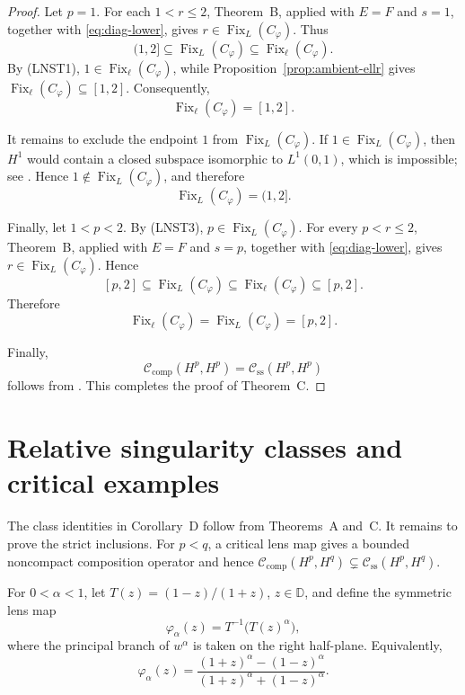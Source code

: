 \documentclass[10pt,a4paper]{amsart}
\newcommand{\D}{\mathbb{D}}
\newcommand{\CK}{\mathcal C_{\mathrm{comp}}}
\newcommand{\CS}{\mathcal C_{\mathrm{ss}}}
\begin{document}
\begin{proof}
Let \(p=1\). For each \(1<r\le2\), Theorem~B, applied with
\(E=F\) and \(s=1\), together with
\eqref{eq:diag-lower}, gives
\(r\in\operatorname{Fix}_{L}(C_\varphi)\). Thus
\[
        (1,2]
        \subseteq
        \operatorname{Fix}_{L}(C_\varphi)
        \subseteq
        \operatorname{Fix}_{\ell}(C_\varphi).
\]
By \textup{(LNST1)},
\(1\in\operatorname{Fix}_{\ell}(C_\varphi)\), while
Proposition~\ref{prop:ambient-ellr} gives
\(\operatorname{Fix}_{\ell}(C_\varphi)\subseteq[1,2]\).
Consequently,
\[
        \operatorname{Fix}_{\ell}(C_\varphi)=[1,2].
\]

It remains to exclude the endpoint \(1\) from
\(\operatorname{Fix}_{L}(C_\varphi)\).
If \(1\in\operatorname{Fix}_{L}(C_\varphi)\), then \(H^1\) would
contain a closed subspace isomorphic to \(L^1(0,1)\), which is
impossible; see \cite[p.~262]{KwapienPelczynski1976}. Hence
\(1\notin\operatorname{Fix}_{L}(C_\varphi)\), and therefore
\[
        \operatorname{Fix}_{L}(C_\varphi)=(1,2].
\]

Finally, let \(1<p<2\). By \textup{(LNST3)},
\(p\in\operatorname{Fix}_{L}(C_\varphi)\). For every \(p<r\le2\),
Theorem~B, applied with \(E=F\) and \(s=p\), together with
\eqref{eq:diag-lower}, gives
\(r\in\operatorname{Fix}_{L}(C_\varphi)\). Hence
\[
        [p,2]
        \subseteq
        \operatorname{Fix}_{L}(C_\varphi)
        \subseteq
        \operatorname{Fix}_{\ell}(C_\varphi)
        \subseteq
        [p,2].
\]
Therefore
\[
        \operatorname{Fix}_{\ell}(C_\varphi)
        =
        \operatorname{Fix}_{L}(C_\varphi)
        =
        [p,2].
\]

Finally,
\[
        \CK(H^p,H^p)
        =
        \CS(H^p,H^p)
\]
follows from \cite[Corollary~1.3]{LNST2017}.
This completes the proof of Theorem~C.
\end{proof}

\section{Relative singularity classes and critical examples}
\label{sec:lens}

The class identities in Corollary~D follow from Theorems~A and~C.
It remains to prove the strict inclusions. For \(p<q\), a critical
lens map gives a bounded noncompact composition operator and hence
\(\CK(H^p,H^q)\subsetneq\CS(H^p,H^q)\).

For \(0<\alpha<1\), let
\(T(z)=(1-z)/(1+z)\), \(z\in\D\), and define the symmetric lens map
\begin{equation}
\label{eq:lens-map}
        \varphi_\alpha(z)
        =
        T^{-1}\bigl(T(z)^\alpha\bigr),
\end{equation}
where the principal branch of \(w^\alpha\) is taken on the right
half-plane. Equivalently,
\[
        \varphi_\alpha(z)
        =
        \frac{(1+z)^\alpha-(1-z)^\alpha}
        {(1+z)^\alpha+(1-z)^\alpha}.
\]
\end{document}
